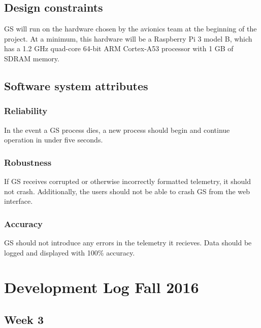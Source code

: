 \documentclass[10pt,draftclsnofoot,onecolumn]{IEEEtran}
\begin{document}
	\subsection{Design constraints}
	GS will run on the hardware chosen by the avionics team at the beginning of the project.
	At a minimum, this hardware will be a Raspberry Pi 3 model B, which has a 1.2 GHz quad-core 64-bit ARM Cortex-A53 processor
	with 1 GB of SDRAM memory.

	\subsection{Software system attributes}

	\subsubsection{Reliability}
	In the event a GS process dies, a new process should begin and continue operation in under five seconds.

	\subsubsection{Robustness}
	If GS receives corrupted or otherwise incorrectly formatted telemetry, it should not crash.
	Additionally, the users should not be able to crash GS from the web interface.

	\subsubsection{Accuracy}
	GS should not introduce any errors in the telemetry it recieves.
	Data should be logged and displayed with 100\% accuracy.

\printindex






\section{Development Log Fall 2016}

\subsection{Week 3}
\end{document}
